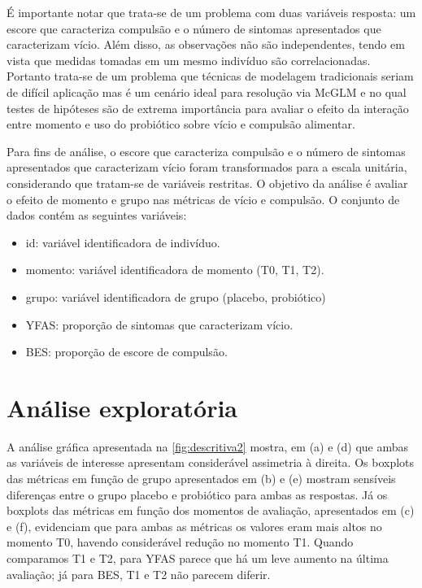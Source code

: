 É importante notar que trata-se de um problema com duas variáveis resposta: um escore que caracteriza compulsão e o número de sintomas apresentados que caracterizam vício. Além disso, as observações não são independentes, tendo em vista que medidas tomadas em um mesmo indivíduo são correlacionadas. Portanto trata-se de um problema que técnicas de modelagem tradicionais seriam de difícil aplicação mas é um cenário ideal para resolução via McGLM e no qual testes de hipóteses são de extrema importância para avaliar o efeito da interação entre momento e uso do probiótico sobre vício e compulsão alimentar.

Para fins de análise, o escore que caracteriza compulsão e o número de sintomas apresentados que caracterizam vício foram transformados para a escala unitária, considerando que tratam-se de variáveis restritas. O objetivo da análise é avaliar o efeito de momento e grupo nas métricas de vício e compulsão. O conjunto de dados contém as seguintes variáveis:

\begin{itemize}
  \item id: variável identificadora de indivíduo.
  \item momento: variável identificadora de momento (T0, T1, T2).
  \item grupo: variável identificadora de grupo (placebo, probiótico)
  \item YFAS: proporção de sintomas que caracterizam vício.
  \item BES: proporção de escore de compulsão.
\end{itemize}


\section{Análise exploratória}

A análise gráfica apresentada na \autoref{fig:descritiva2} mostra, em (a) e (d) que ambas as variáveis de interesse apresentam considerável assimetria à direita. Os boxplots das métricas em função de grupo apresentados em (b) e (e) mostram sensíveis diferenças entre o grupo placebo e probiótico para ambas as respostas. Já os boxplots das métricas em função dos momentos de avaliação, apresentados em (c) e (f), evidenciam que para ambas as métricas os valores eram mais altos no momento T0, havendo considerável redução no momento T1. Quando comparamos T1 e T2, para YFAS parece que há um leve aumento na última avaliação; já para BES, T1 e T2 não parecem diferir.

